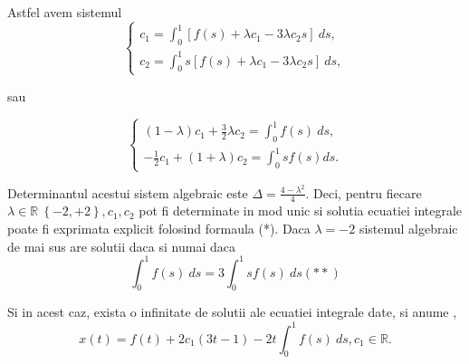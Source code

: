 \documentclass[a4paper,12pt,oneside]{report}
\begin{document}
\begin{enumerate}
\begin{enumerate}[label=(\alph*)]
		      		      Astfel avem sistemul
		      		      \begin{displaymath}
		      		      	\left\{\begin{matrix}
		      		      	c_{1} = \int_{0}^{1} \left [ f\left ( s \right ) + \lambda c_{1} - 3\lambda c_{2}s \right ]\ ds,\\ 
		      		      	c_{2} = \int_{0}^{1}s \left [ f\left ( s \right ) + \lambda c_{1} - 3\lambda c_{2}s \right ]\ ds,
		      		      	\end{matrix}\right.
		      		      \end{displaymath}
		      		      		      		      		      		      
		      		      sau
		      		      		      		      		      		      
		      		      \begin{displaymath}
		      		      	\left\{\begin{matrix}
		      		      	\left ( 1 - \lambda  \right )c_{1} + \frac{3}{2}\lambda c_{2} = \int_{0}^{1}f\left ( s \right ) \ ds,\\ 
		      		      	-\frac{1}{2}c_{1} + \left ( 1 + \lambda  \right )c_{2} = \int_{0}^{1}s f\left ( s \right ) ds.
		      		      	\end{matrix}\right.
		      		      \end{displaymath}
		      		      		      		      		      		      
		      		      Determinantul acestui sistem algebraic este \(\Delta  =  \frac{4 - \lambda ^{2} }{4}\). Deci, pentru fiecare \(\lambda \in \mathbb{R} \ \left \{ -2,+2 \right \}, c_{1}, c_{2}\) pot fi determinate in mod unic si solutia ecuatiei integrale poate fi exprimata explicit folosind formaula (*). 
		      		      Daca \(\lambda = -2\) sistemul algebraic de mai sus are solutii daca si numai daca 
		      		      \begin{displaymath}
		      		      	\int_{0}^{1}f\left ( s \right ) \ ds  = 3\int_{0}^{1}sf\left ( s  \right )\ ds (**)
		      		      \end{displaymath}
		      		      		      		      		      		      
		      		      Si in acest caz, exista o infinitate de solutii ale ecuatiei integrale date, si anume , 
		      		      \begin{displaymath}
		      		      	x\left ( t \right ) = f\left ( t \right ) + 2c_{1}\left ( 3t-1 \right ) - 2t\int_{0}^{1}f\left ( s \right ) \ ds, c_{1 }\in \mathbb{R}. 
		      		      \end{displaymath}
		      		      		      		      		      		      

\end{enumerate}
\end{enumerate}
\end{document}
